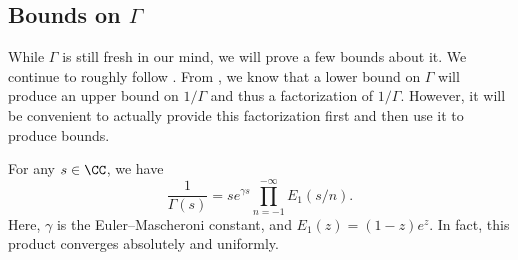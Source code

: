 \documentclass[../notes.tex]{subfiles}
\begin{document}
\subsection{Bounds on \texorpdfstring{$\Gamma$}{ Gamma}}
While $\Gamma$ is still fresh in our mind, we will prove a few bounds about it. We continue to roughly follow \cite{tao-gamma-function}. From , we know that a lower bound on $\Gamma$ will produce an upper bound on $1/\Gamma$ and thus a factorization of $1/\Gamma$. However, it will be convenient to actually provide this factorization first and then use it to produce bounds.
\begin{proposition} \label{prop:hadamard-gamma}
	For any $s\in\CC$, we have
	\[\frac1{\Gamma(s)}=se^{\gamma s}\prod_{n=-1}^{-\infty}E_1(s/n).\]
	Here, $\gamma$ is the Euler--Mascheroni constant, and $E_1(z)=(1-z)e^z$. In fact, this product converges absolutely and uniformly.
\end{proposition}
\end{document}

